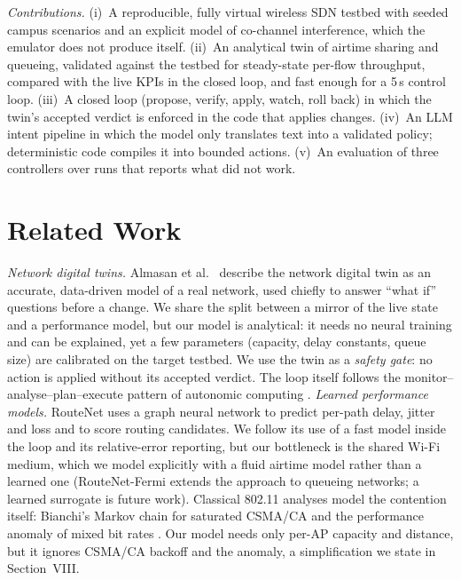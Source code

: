 \documentclass[conference]{IEEEtran}
\begin{document}
\emph{Contributions.}
(i)~A reproducible, fully virtual wireless SDN testbed with seeded campus scenarios and an explicit model of co-channel interference, which the emulator does not produce itself.
(ii)~An analytical twin of airtime sharing and queueing, validated against the testbed for steady-state per-flow throughput, compared with the live KPIs in the closed loop, and fast enough for a 5\,s control loop.
(iii)~A closed loop (propose, verify, apply, watch, roll back) in which the twin's accepted verdict is enforced in the code that applies changes.
(iv)~An LLM intent pipeline in which the model only translates text into a validated policy; deterministic code compiles it into bounded actions.
(v)~An evaluation of three controllers over \NumRuns{} runs that reports what did not work.

\section{Related Work}
\emph{Network digital twins.} Almasan et al.\ \cite{almasan2022} describe the network digital twin as an accurate, data-driven model of a real network, used chiefly to answer ``what if'' questions before a change. We share the split between a mirror of the live state and a performance model, but our model is analytical: it needs no neural training and can be explained, yet a few parameters (capacity, delay constants, queue size) are calibrated on the target testbed. We use the twin as a \emph{safety gate}: no action is applied without its accepted verdict. The loop itself follows the monitor--analyse--plan--execute pattern of autonomic computing \cite{kephart2003}.
\emph{Learned performance models.} RouteNet \cite{rusek2020} uses a graph neural network to predict per-path delay, jitter and loss and to score routing candidates. We follow its use of a fast model inside the loop and its relative-error reporting, but our bottleneck is the shared Wi-Fi medium, which we model explicitly with a fluid airtime model rather than a learned one (RouteNet-Fermi \cite{ferriol2023} extends the approach to queueing networks; a learned surrogate is future work). Classical 802.11 analyses model the contention itself: Bianchi's Markov chain \cite{bianchi2000} for saturated CSMA/CA and the performance anomaly of mixed bit rates \cite{heusse2003}. Our model needs only per-AP capacity and distance, but it ignores CSMA/CA backoff and the anomaly, a simplification we state in Section~VIII.
\end{document}
